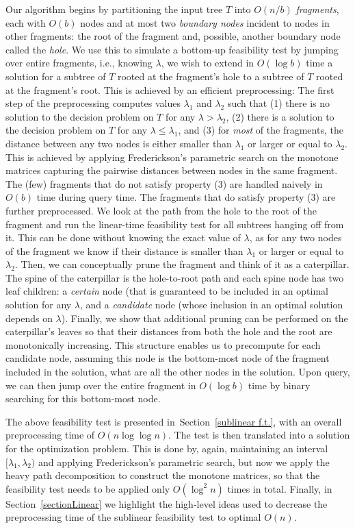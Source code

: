 \documentclass[a4paper,UKenglish]{lipics-v2016}
\theoremstyle{plain}
\begin{document}
Our algorithm begins by partitioning the input tree $T$ into $O(n/b)$ {\em fragments}, each with $O(b)$ nodes and at most two {\em boundary nodes} incident to nodes in other fragments: the root of the fragment and, possible, another boundary node called the {\em hole}.
We use this to simulate a bottom-up feasibility test by jumping over entire 
fragments, i.e., knowing $\lambda$, we wish to extend in $O(\log b)$ time a solution for a subtree of $T$ rooted at the fragment's hole to a subtree of $T$ rooted at the fragment's root. This is achieved by an efficient preprocessing: 
% 
The first step of the preprocessing computes values $\lambda_1$ and  $\lambda_2$ such that (1) there is no solution to the decision problem on $T$ for any $\lambda > \lambda_2$, (2) there is a solution to the decision problem on $T$ for any $\lambda \le \lambda_1$, and (3) for {\em most} of the fragments, the distance between any two nodes is either smaller than $\lambda_1$ or larger or equal to $\lambda_2$. This is achieved by applying Frederickson's parametric search on the monotone matrices capturing the pairwise distances between nodes in the same fragment. The (few) fragments that do not satisfy property (3) are handled naively in $O(b)$ time during query time. 
The fragments that do satisfy property (3) are further preprocessed. We look at the path from the hole to the root of the
fragment and run the linear-time feasibility test for all subtrees hanging off from it. This can be done without knowing the exact value of $\lambda$,
as for any two nodes of the fragment we know if their distance is smaller than $\lambda_{1}$ or larger or equal to $\lambda_{2}$. Then, we can conceptually
prune the fragment and think of it as a caterpillar. The spine of the caterpillar is the hole-to-root path and each spine node has two leaf children: a \emph{certain} node (that is guaranteed to be included in an optimal solution for any $\lambda$, and a \emph{candidate} node (whose inclusion in an optimal solution depends on $\lambda$). Finally, we show that  additional pruning can be performed on the caterpillar's leaves so that their distances from both the hole and the root are monotonically increasing. This structure enables us to precompute for each candidate node, assuming this node is the bottom-most node
of the fragment included in the solution, what are all the other nodes in the solution. Upon query, we can then jump over the entire fragment  in $O(\log b)$ time by binary searching for this bottom-most node.

The above feasibility test is presented in~Section~\ref{sublinear f.t.}, with an overall preprocessing time of $O(n\log\log n)$.
The test is then translated into a solution for the optimization problem. This is done by, again, maintaining an interval
$[\lambda_{1},\lambda_{2})$ and applying Frederickson's parametric search, but now we apply the heavy path decomposition to construct
the monotone matrices, so that the feasibility test needs to be applied only $O(\log^{2}n)$ times in total.
Finally, in Section~\ref{sectionLinear} we highlight the high-level ideas used to decrease the preprocessing time of the sublinear feasibility
test to optimal $O(n)$.
\end{document}
